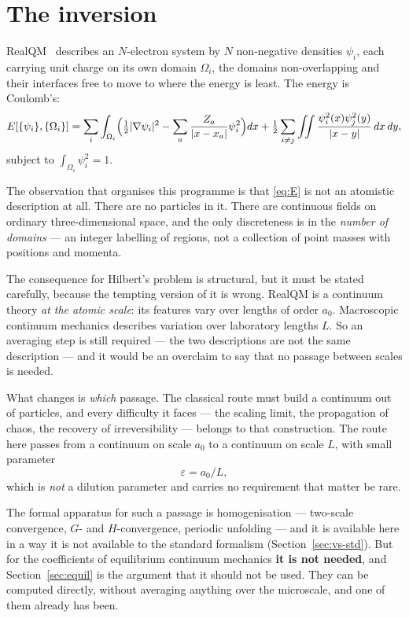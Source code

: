 \documentclass[11pt]{article}
\newcommand{\half}{\tfrac12}
\newcommand{\grad}{\nabla}
\begin{document}
\section{The inversion}\label{sec:inversion}

RealQM~\cite{realqm,realqmbook} describes an $N$-electron system by $N$ non-negative densities
$\psi_i$, each carrying unit charge on its own domain $\Omega_i$, the domains non-overlapping and
their interfaces free to move to where the energy is least. The energy is Coulomb's:
\begin{equation}\label{eq:E}
E[\{\psi_i\},\{\Omega_i\}]=\sum_i\int_{\Omega_i}\Bigl(\half|\grad\psi_i|^2
-\sum_a\frac{Z_a}{|x-x_a|}\psi_i^2\Bigr)dx
+\half\sum_{i\neq j}\iint\frac{\psi_i^2(x)\psi_j^2(y)}{|x-y|}\,dx\,dy ,
\end{equation}
subject to $\int_{\Omega_i}\psi_i^2=1$.

The observation that organises this programme is that \eqref{eq:E} is not an atomistic description
at all. There are no particles in it. There are continuous fields on ordinary three-dimensional
space, and the only discreteness is in the \emph{number of domains} --- an integer labelling of
regions, not a collection of point masses with positions and momenta.

The consequence for Hilbert's problem is structural, but it must be stated carefully, because the
tempting version of it is wrong. RealQM is a continuum theory \emph{at the atomic scale}: its
features vary over lengths of order $a_0$. Macroscopic continuum mechanics describes variation over
laboratory lengths $L$. So an averaging step is still required --- the two descriptions are not the
same description --- and it would be an overclaim to say that no passage between scales is needed.

What changes is \emph{which} passage. The classical route must build a continuum out of particles,
and every difficulty it faces --- the scaling limit, the propagation of chaos, the recovery of
irreversibility --- belongs to that construction. The route here passes from a continuum on scale
$a_0$ to a continuum on scale $L$, with small parameter
\begin{equation}\label{eq:eps}
\varepsilon = a_0/L ,
\end{equation}
which is \emph{not} a dilution parameter and carries no requirement that matter be rare.

The formal apparatus for such a passage is homogenisation --- two-scale convergence, $G$- and
$H$-convergence, periodic unfolding --- and it is available here in a way it is not available to the
standard formalism (Section~\ref{sec:vs-std}). But for the coefficients of equilibrium continuum
mechanics \textbf{it is not needed}, and Section~\ref{sec:equil} is the argument that it should not
be used. They can be computed directly, without averaging anything over the microscale, and one of
them already has been.
\end{document}
